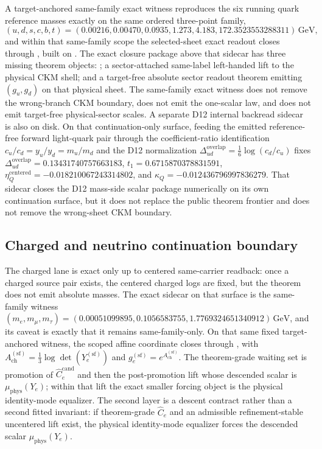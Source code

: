 A target-anchored same-family exact witness reproduces the six running quark reference masses exactly on the same ordered three-point family,
\[
(u,d,s,c,b,t)=(0.00216,0.00470,0.0935,1.273,4.183,172.3523553288311)\,\mathrm{GeV},
\]
and within that same-family scope the selected-sheet exact readout closes through , built on . The exact closure package above that sidecar has three missing theorem objects: ; a sector-attached same-label left-handed lift to the physical CKM shell; and a target-free absolute sector readout theorem emitting \((g_u,g_d)\) on that physical sheet. The same-family exact witness does not remove the wrong-branch CKM boundary, does not emit the one-scalar law, and does not emit target-free physical-sector scales.
A separate D12 internal backread sidecar is also on disk. On that continuation-only surface, feeding the emitted reference-free forward light-quark pair through the coefficient-ratio identification \(c_u/c_d=y_u/y_d=m_u/m_d\) and the D12 normalization \(\Delta_{ud}^{\mathrm{overlap}}=\tfrac16\log(c_d/c_u)\) fixes \(\Delta_{ud}^{\mathrm{overlap}}=0.13431740757663183\), \(t_1=0.6715870378831591\), \(\eta_Q^{\mathrm{centered}}=-0.018210067243314802\), and \(\kappa_Q=-0.012436796997836279\). That sidecar closes the D12 mass-side scalar package numerically on its own continuation surface, but it does not replace the public theorem frontier and does not remove the wrong-sheet CKM boundary.

\subsection{Charged and neutrino continuation boundary}

The charged lane is exact only up to centered same-carrier readback: once a charged source pair exists, the centered charged logs are fixed, but the theorem does not emit absolute masses. The exact sidecar on that surface is the same-family witness \((m_e,m_\mu,m_\tau)=(0.00051099895,0.1056583755,1.7769324651340912)\,\mathrm{GeV}\), and its caveat is exactly that it remains same-family-only. On that same fixed target-anchored witness, the scoped affine coordinate closes through , with \(A_{\mathrm{ch}}^{(\mathrm{sf})}=\tfrac13\log\det(Y_e^{(\mathrm{sf})})\) and \(g_e^{(\mathrm{sf})}=e^{A_{\mathrm{ch}}^{(\mathrm{sf})}}\). The theorem-grade waiting set is promotion of \(\widehat C_e^{\mathrm{cand}}\) and then the post-promotion lift whose descended scalar is \(\mu_{\mathrm{phys}}(Y_e)\); within that lift the exact smaller forcing object is the physical identity-mode equalizer.
The second layer is a descent contract rather than a second fitted invariant: if theorem-grade \(\widehat C_e\) and an admissible refinement-stable uncentered lift exist, the physical identity-mode equalizer forces the descended scalar \(\mu_{\mathrm{phys}}(Y_e)\).

